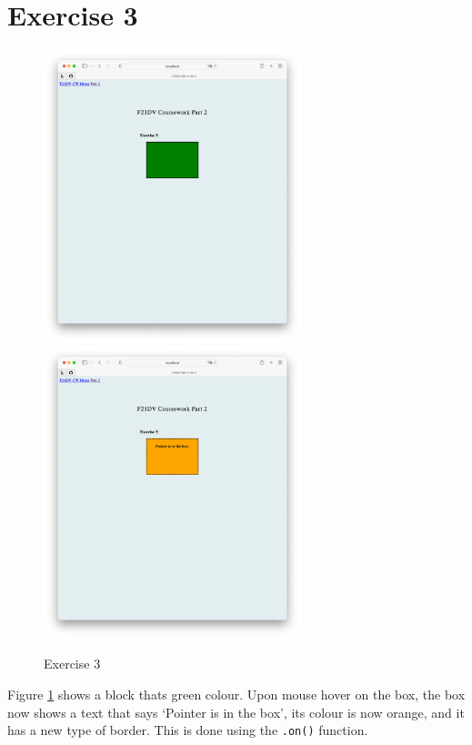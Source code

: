\documentclass{scrreprt}
\begin{document}
\section{Exercise 3}
\begin{figure}[!ht]
    \centering
    \includegraphics[width = 7.5cm]{images/ex3_1.png}
    \includegraphics[width = 7.5cm]{images/ex3_2.png}
    \label{fig:ex3}
    \caption{Exercise 3}
\end{figure}
\FloatBarrier

Figure \ref{fig:ex3} shows a block thats green colour. Upon mouse hover on the box, the box now shows a text that says `Pointer is in the box', its colour is now orange, and it has a new type of border. This is done using the \verb|.on()| function.

\newpage
\end{document}

